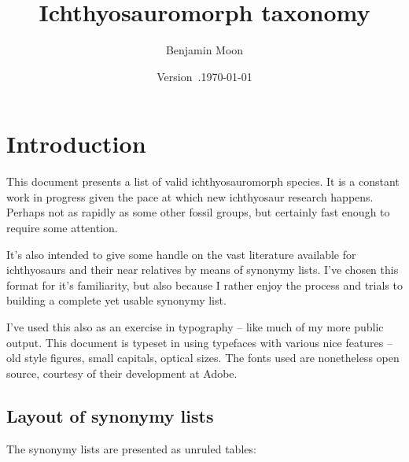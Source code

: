 \documentclass[notuftebib,font=source,UKenglish]{tufte-lualatex}
\title{Ichthyosauromorph taxonomy}
\author{Benjamin Moon}
\date{\sffamily Version~\version.\isodash{}\isodate\today}
\begin{document}
\maketitle

\tableofcontents

\section{Introduction}

This document presents a list of valid ichthyosauromorph species. It is a
constant work in progress given the pace at which new ichthyosaur research
happens. Perhaps not as rapidly as some other fossil groups, but certainly fast
enough to require some attention.

It's also intended to give some handle on the vast literature available for
ichthyosaurs and their near relatives by means of synonymy lists. I've chosen
this format for it's familiarity, but also because I rather enjoy the process
and trials to building a complete yet usable synonymy list.

I've used this also as an exercise in typography – like much of my more public
output. This document is typeset in \LuaLaTeX{} using typefaces with various
nice features – old style figures, small capitals, optical sizes. The fonts used
are nonetheless open source, courtesy of their development at Adobe.

\subsection{Layout of synonymy lists}%
\label{ssec:key-synonymy-lists}

The synonymy lists are presented as unruled tables:
\end{document}
